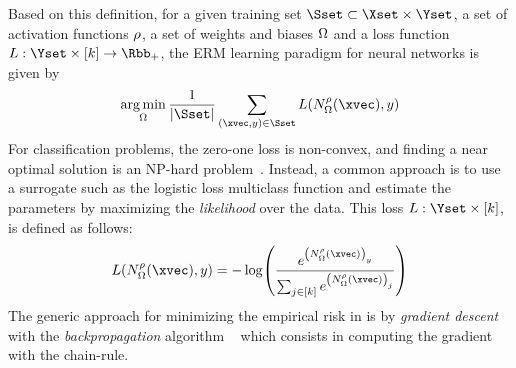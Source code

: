 \noindent
Based on this definition, for a given training set $\Sset \subset \Xset \times \Yset$, a set of activation functions $\rho$, a set of weights and biases $\Omega$ and a loss function $L: \Yset \times [k] \rightarrow \Rbb_+$, the ERM learning paradigm for neural networks is given by
\begin{equation} \label{equation:ch2-erm_neural_network}
  \argmin_{\weights} \frac{1}{|\Sset|} \sum_{(\xvec, y) \in \Sset} L(N^\act_\weights(\xvec), y) 
\end{equation}
For classification problems, the zero-one loss is non-convex, and finding a near optimal solution is an NP-hard problem~\cite{feldman2012agnostic,bendavid2003difficulty}.
Instead, a common approach is to use a surrogate such as the logistic loss multiclass function and estimate the parameters by maximizing the \emph{likelihood} over the data.
This loss $L:\Yset \times [k]$, is defined as follows:
\begin{equation}
  L(N^\rho_\Omega(\xvec), y) = -\log
    \left(
      \frac
        {e^{\left(N^\rho_\Omega(\xvec)\right)_y}}
	{\sum_{j\in[k]} e^{\left(N^\rho_\Omega(\xvec)\right)_j}}
    \right)
\end{equation}
The generic approach for minimizing the empirical risk in  is by \emph{gradient descent} with the \emph{backpropagation} algorithm ~\cite{rumelhart1986learning} which consists in computing the gradient with the chain-rule.






